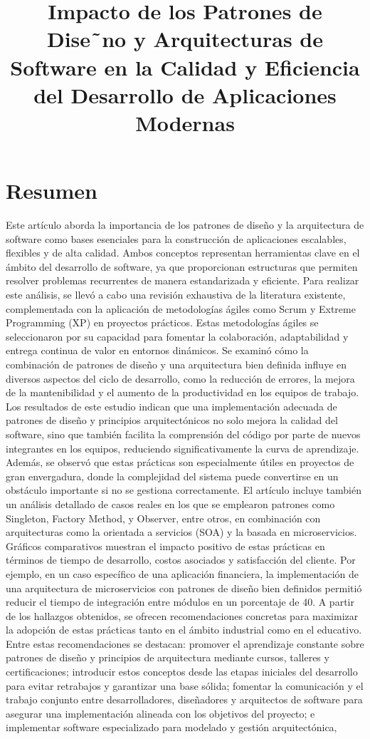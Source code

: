 \documentclass[conference]{IEEEtran}
\title{Impacto de los Patrones de Dise˜no y Arquitecturas
de Software en la Calidad y Eficiencia del
Desarrollo de Aplicaciones Modernas}
\author{
    \IEEEauthorblockN{Jes\'us Ariel Gonz\'alez Bonilla}
    \IEEEauthorblockA{Neiva, Huila}
}
\begin{document}
\maketitle

\section{Resumen}
Este artículo aborda la importancia de los patrones de diseño y la arquitectura de software como bases esenciales para la construcción de aplicaciones escalables, flexibles y de alta calidad. Ambos conceptos representan herramientas clave en el ámbito del desarrollo de software, ya que proporcionan estructuras que permiten resolver problemas recurrentes de manera estandarizada y eficiente. Para realizar este análisis, se llevó a cabo una revisión exhaustiva de la literatura existente, complementada con la aplicación de metodologías ágiles como Scrum y Extreme Programming (XP) en proyectos prácticos. Estas metodologías ágiles se seleccionaron por su capacidad para fomentar la colaboración, adaptabilidad y entrega continua de valor en entornos dinámicos. Se examinó cómo la combinación de patrones de diseño y una arquitectura bien definida influye en diversos aspectos del ciclo de desarrollo, como la reducción de errores, la mejora de la mantenibilidad y el aumento de la productividad en los equipos de trabajo. Los resultados de este estudio indican que una implementación adecuada de patrones de diseño y principios arquitectónicos no solo mejora la calidad del software, sino que también facilita la comprensión del código por parte de nuevos integrantes en los equipos, reduciendo significativamente la curva de aprendizaje. Además, se observó que estas prácticas son especialmente útiles en proyectos de gran envergadura, donde la complejidad del sistema puede convertirse en un obstáculo importante si no se gestiona correctamente. El artículo incluye también un análisis detallado de casos reales en los que se emplearon patrones como Singleton, Factory Method, y Observer, entre otros, en combinación con arquitecturas como la orientada a servicios (SOA) y la basada en microservicios. Gráficos comparativos muestran el impacto positivo de estas prácticas en términos de tiempo de desarrollo, costos asociados y satisfacción del cliente. Por ejemplo, en un caso específico de una aplicación financiera, la implementación de una arquitectura de microservicios con patrones de diseño bien definidos permitió reducir el tiempo de integración entre módulos en un porcentaje de 40. A partir de los hallazgos obtenidos, se ofrecen recomendaciones concretas para maximizar la adopción de estas prácticas tanto en el ámbito industrial como en el educativo. Entre estas recomendaciones se destacan: promover el aprendizaje constante sobre patrones de diseño y principios de arquitectura mediante cursos, talleres y certificaciones; introducir estos conceptos desde las etapas iniciales del desarrollo para evitar retrabajos y garantizar una base sólida; fomentar la comunicación y el trabajo conjunto entre desarrolladores, diseñadores y arquitectos de software para asegurar una implementación alineada con los objetivos del proyecto; e implementar software especializado para modelado y gestión arquitectónica, 
\end{document}
